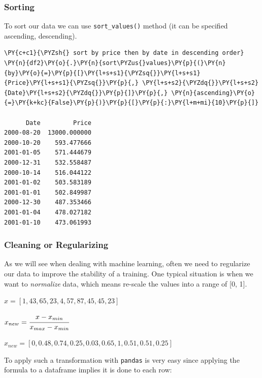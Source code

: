 \subsubsection{Sorting}\label{sorting}

To sort our data we can use \texttt{sort\_values()} method (it can be specified ascending, descending).

\begin{tcolorbox}[breakable, size=fbox, boxrule=1pt, pad at break*=1mm,colback=cellbackground, colframe=cellborder]
\begin{Verbatim}[commandchars=\\\{\}]
\PY{c+c1}{\PYZsh{} sort by price then by date in descending order}
\PY{n}{df2}\PY{o}{.}\PY{n}{sort\PYZus{}values}\PY{p}{(}\PY{n}{by}\PY{o}{=}\PY{p}{[}\PY{l+s+s1}{\PYZsq{}}\PY{l+s+s1}{Price}\PY{l+s+s1}{\PYZsq{}}\PY{p}{,} \PY{l+s+s2}{\PYZdq{}}\PY{l+s+s2}{Date}\PY{l+s+s2}{\PYZdq{}}\PY{p}{]}\PY{p}{,} \PY{n}{ascending}\PY{o}{=}\PY{k+kc}{False}\PY{p}{)}\PY{p}{[}\PY{p}{:}\PY{l+m+mi}{10}\PY{p}{]}

      Date         Price
2000-08-20  13000.000000
2000-10-20    593.477666
2001-01-05    571.444679
2000-12-31    532.558487
2000-10-14    516.044122
2001-01-02    503.583189
2001-01-01    502.849987
2000-12-30    487.353466
2001-01-04    478.027182
2001-01-10    473.061993
\end{Verbatim}
\end{tcolorbox}
        
\subsubsection{Cleaning or Regularizing}\label{cleaning-or-regularizing}

As we will see when dealing with machine learning, often we need to regularize our data to improve the stability of a training. One typical situation is when we want to \emph{normalize} data, which means re-scale the values into a range of {[}0, 1{]}.

\(x = [1,43,65,23,4,57,87,45,45,23]\)

\(x_{new} = \cfrac{x - x_{min}}{x_{max} - x_{min}}\)

\(x_{new} = [0,0.48,0.74,0.25,0.03,0.65,1,0.51,0.51,0.25]\)

To apply such a transformation with \texttt{pandas} is very easy since applying the formula to a dataframe implies it is done to each row:

